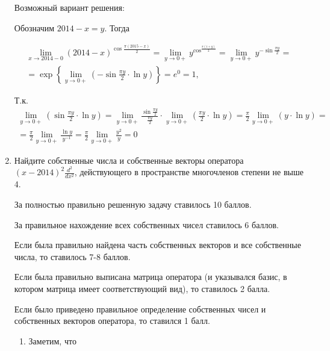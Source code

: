 \documentclass[pdftex,12pt,a4paper]{article}
\begin{document}
\begin{enumerate}
Возможный вариант решения:

Обозначим $2014-x=y$. Тогда 

\[\begin{array}{l} {\mathop{\lim }\limits_{x\to 2014-0} (2014-x)^{\cos \frac{\pi (2015-x)}{2} } =\mathop{\lim }\limits_{y\to 0+} y^{\cos ^{\frac{\pi (1+y)}{2} } } =\mathop{\lim }\limits_{y\to 0+} y^{-\sin \frac{\pi y}{2} } =} \\ {=\exp \left\{\mathop{\lim }\limits_{y\to 0+} \left(-\sin \frac{\pi y}{2} \cdot \ln y\right)\right\}=e^{0} =1,} \end{array}\] 

Т.к. $\begin{array}{l} {\mathop{\lim }\limits_{y\to 0+} \left(\sin \frac{\pi y}{2} \cdot \ln y\right)=\mathop{\lim }\limits_{y\to 0+} \frac{\sin \frac{\pi y}{2} }{\frac{\pi y}{2} } \cdot \mathop{\lim }\limits_{y\to 0+} \left(\frac{\pi y}{2} \cdot \ln y\right)=\frac{\pi }{2} \mathop{\lim }\limits_{y\to 0+} \left(y\cdot \ln y\right)=} \\ {=\frac{\pi }{2} \mathop{\lim }\limits_{y\to 0+} \frac{\ln y}{y^{-1} } =\frac{\pi }{2} \mathop{\lim }\limits_{y\to 0+} \frac{y^{2} }{y} =0} \end{array}$


\vspace{6pt}

\item Найдите собственные числа и собственные векторы оператора $(x-2014)^{2} \frac{d^{2} }{dx^{2} } $, действующего в пространстве многочленов степени не выше 4.



\solution

За полностью правильно решенную задачу ставилось 10 баллов.

За правильное нахождение всех собственных чисел ставилось 6 баллов.

Если была правильно найдена часть собственных векторов и все собственные числа, то ставилось 7-8 баллов.

Если была правильно выписана матрица оператора (и указывался базис, в котором матрица имеет соответствующий вид), то ставилось 2 балла.

Если было приведено правильное определение собственных чисел и собственных векторов оператора, то ставился 1 балл.

 

\begin{enumerate}
\item Заметим, что 


\end{enumerate}
\end{enumerate}
\end{document}
